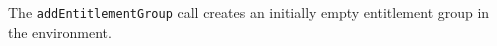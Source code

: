 The \verb+addEntitlementGroup+ call creates an initially empty entitlement group in the environment.
